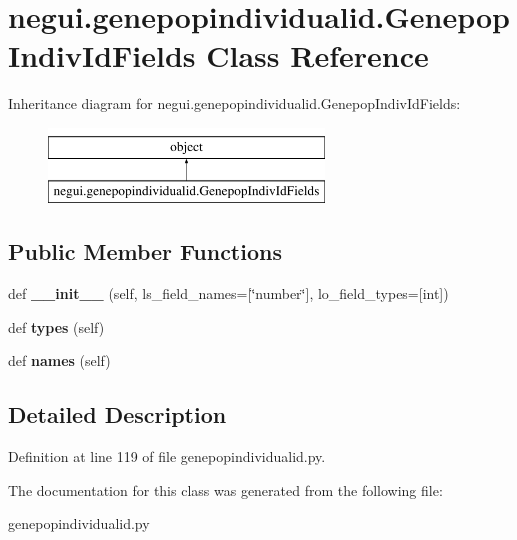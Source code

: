 \hypertarget{classnegui_1_1genepopindividualid_1_1GenepopIndivIdFields}{}\section{negui.\+genepopindividualid.\+Genepop\+Indiv\+Id\+Fields Class Reference}
\label{classnegui_1_1genepopindividualid_1_1GenepopIndivIdFields}
Inheritance diagram for negui.\+genepopindividualid.\+Genepop\+Indiv\+Id\+Fields\+:\begin{figure}[H]
\begin{center}
\leavevmode
\includegraphics[height=2.000000cm]{classnegui_1_1genepopindividualid_1_1GenepopIndivIdFields}
\end{center}
\end{figure}
\subsection*{Public Member Functions}
\begin{DoxyCompactItemize}
\item 
def {\bfseries \+\_\+\+\_\+init\+\_\+\+\_\+} (self, ls\+\_\+field\+\_\+names=\mbox{[}\char`\"{}number\char`\"{}\mbox{]}, lo\+\_\+field\+\_\+types=\mbox{[}int\mbox{]})\hypertarget{classnegui_1_1genepopindividualid_1_1GenepopIndivIdFields_a76e45449d1c5386efcaadbabaa8e7dc0}{}\label{classnegui_1_1genepopindividualid_1_1GenepopIndivIdFields_a76e45449d1c5386efcaadbabaa8e7dc0}

\item 
def {\bfseries types} (self)\hypertarget{classnegui_1_1genepopindividualid_1_1GenepopIndivIdFields_a45ccbceb841638d3a9cedaa1d220137b}{}\label{classnegui_1_1genepopindividualid_1_1GenepopIndivIdFields_a45ccbceb841638d3a9cedaa1d220137b}

\item 
def {\bfseries names} (self)\hypertarget{classnegui_1_1genepopindividualid_1_1GenepopIndivIdFields_aed28d052aaddf07f914bb9190f8be737}{}\label{classnegui_1_1genepopindividualid_1_1GenepopIndivIdFields_aed28d052aaddf07f914bb9190f8be737}

\end{DoxyCompactItemize}


\subsection{Detailed Description}


Definition at line 119 of file genepopindividualid.\+py.



The documentation for this class was generated from the following file\+:\begin{DoxyCompactItemize}
\item 
genepopindividualid.\+py\end{DoxyCompactItemize}
